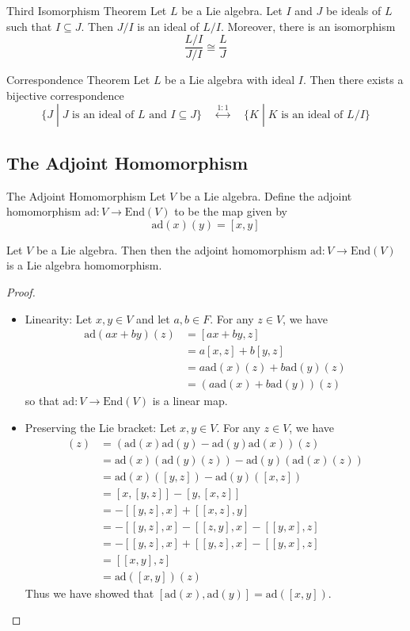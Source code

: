 \documentclass[a4paper]{article}
\begin{document}
\begin{thm}{Third Isomorphism Theorem}{} Let $L$ be a Lie algebra. Let $I$ and $J$ be ideals of $L$ such that $I\subseteq J$. Then $J/I$ is an ideal of $L/I$. Moreover, there is an isomorphism $$\frac{L/I}{J/I}\cong\frac{L}{J}$$
\end{thm}

\begin{thm}{Correspondence Theorem}{} Let $L$ be a Lie algebra with ideal $I$. Then there exists a bijective correspondence $$\{J\;|\;J\text{ is an ideal of }L\text{ and }I\subseteq J\}\;\;\;\;\overset{1:1}{\longleftrightarrow}\;\;\;\;\{K\;|\;K\text{ is an ideal of }L/I\}$$
\end{thm}

\subsection{The Adjoint Homomorphism}
\begin{defn}{The Adjoint Homomorphism}{} Let $V$ be a Lie algebra. Define the adjoint homomorphism $\text{ad}:V\to\text{End}(V)$ to be the map given by $$\text{ad}(x)(y)=[x,y]$$
\end{defn}

\begin{lmm}{}{} Let $V$ be a Lie algebra. Then then the adjoint homomorphism $\text{ad}:V\to\text{End}(V)$ is a Lie algebra homomorphism. \tcbline
\begin{proof}~\\
\begin{itemize}
\item Linearity: Let $x,y\in V$ and let $a,b\in F$. For any $z\in V$, we have
\begin{align*}
\text{ad}(ax+by)(z)&=[ax+by,z]\\
&=a[x,z]+b[y,z]\\
&=a\text{ad}(x)(z)+b\text{ad}(y)(z)\\
&=\left(a\text{ad}(x)+b\text{ad}(y)\right)(z)
\end{align*}
so that $\text{ad}:V\to\text{End}(V)$ is a linear map. 
\item Preserving the Lie bracket: Let $x,y\in V$. For any $z\in V$, we have
\begin{align*}
[\text{ad}(x),\text{ad}(y)](z)&=\left(\text{ad}(x)\text{ad}(y)-\text{ad}(y)\text{ad}(x)\right)(z)\\
&=\text{ad}(x)\left(\text{ad}(y)(z)\right)-\text{ad}(y)\left(\text{ad}(x)(z)\right)\\
&=\text{ad}(x)([y,z])-\text{ad}(y)([x,z])\\
&=[x,[y,z]]-[y,[x,z]]\\
&=-[[y,z],x]+[[x,z],y]\\
&=-[[y,z],x]-[[z,y],x]-[[y,x],z]\\
&=-[[y,z],x]+[[y,z],x]-[[y,x],z]\\
&=[[x,y],z]\\
&=\text{ad}([x,y])(z)
\end{align*}
Thus we have showed that $[\text{ad}(x),\text{ad}(y)]=\text{ad}([x,y])$. 
\end{itemize}
\end{proof}
\end{lmm}
\end{document}
